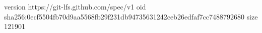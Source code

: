 version https://git-lfs.github.com/spec/v1
oid sha256:0ecf5504fb70d9aa5568fb29f231db94735631242ceb26edfaf7cc7488792680
size 121901
